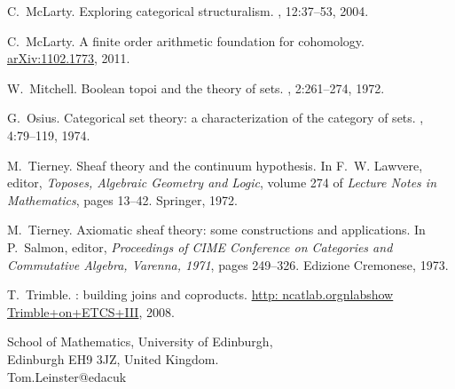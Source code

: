 \documentclass[12pt]{article}
\begin{document}
\begin{thebibliography}{10}
C.~Mc{L}arty.
\newblock Exploring categorical structuralism.
, 12:37--53, 2004.

C.~Mc{L}arty.
\newblock A finite order arithmetic foundation for cohomology.
\newblock \href{http://arxiv.org/abs/1102.1773}{arXiv:1102.1773}, 2011.

W.~Mitchell.
\newblock Boolean topoi and the theory of sets.
, 2:261--274, 1972.

G.~Osius.
\newblock Categorical set theory: a characterization of the category of sets.
, 4:79--119, 1974.

M.~Tierney.
\newblock Sheaf theory and the continuum hypothesis.
\newblock In F.~W. Lawvere, editor, {\em Toposes, Algebraic Geometry and
  Logic}, volume 274 of {\em Lecture Notes in Mathematics}, pages 13--42.
  Springer, 1972.

M.~Tierney.
\newblock Axiomatic sheaf theory: some constructions and applications.
\newblock In P.~Salmon, editor, {\em Proceedings of CIME Conference on
  Categories and Commutative Algebra, Varenna, 1971}, pages 249--326. Edizione
  Cremonese, 1973.

T.~Trimble.
: building joins and coproducts.
\newblock \href{http://ncatlab.org/nlab/show/Trimble+on+ETCS+III}{http:\dblslsh
  ncatlab.org\slsh nlab\slsh show\slsh
  Trimble+\linebreak[0]on+\linebreak[0]ETCS+III}, 2008.

\end{thebibliography}



\bigskip
\noindent
School of Mathematics,
University of Edinburgh,\\
Edinburgh EH9 3JZ,
United Kingdom.\\
Tom.Leinster\mbox{}@\mbox{}ed\dt ac\dt uk
\end{document}
